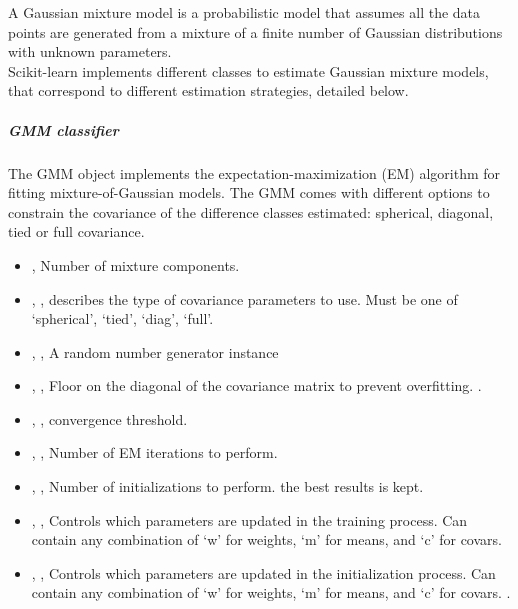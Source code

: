 A Gaussian mixture model is a probabilistic model that assumes all
 the data points are generated from a mixture of a finite number of
 Gaussian distributions with unknown parameters.
\\
Scikit-learn implements different classes to estimate Gaussian
mixture models, that correspond to different estimation strategies,
 detailed below.

\subparagraph{ GMM classifier} \hfill
\label{subparagraph:GMMClass}

The GMM object implements the expectation-maximization (EM)
algorithm for fitting mixture-of-Gaussian models. The GMM comes with different options
 to constrain the covariance of  the difference classes estimated: spherical, diagonal, tied or
 full covariance.

\begin{itemize}
	\item {},  Number of mixture components. 
	\item {}, , describes the type of covariance parameters to use.
Must be one of ‘spherical’, ‘tied’, ‘diag’, ‘full’. 
	\item {}, ,  A random number
generator instance 
	\item {}, ,
 Floor on the diagonal of the covariance matrix to prevent overfitting.
 .
	\item {}, ,
convergence threshold. 
	\item {}, ,
Number of EM iterations to perform. 
	\item {}, ,
Number of initializations to perform. the best results is kept.
	\item {}, ,
 Controls which parameters are updated in the training process.
Can contain any combination of ‘w’ for weights, ‘m’ for means, and
‘c’ for covars. 
	\item {}, , Controls which parameters are updated in the initialization
process. Can contain any combination of ‘w’ for weights, ‘m’ for means,
 and ‘c’ for covars. .
\end{itemize}

